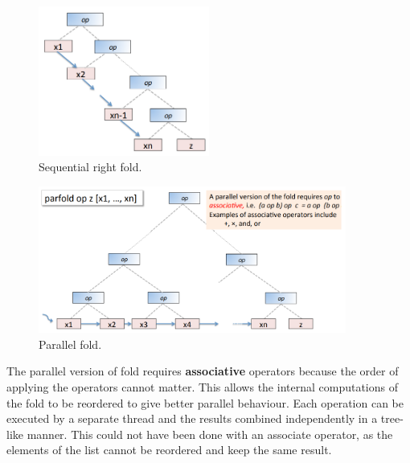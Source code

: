 \documentclass[CS4204-Notes.tex]{subfiles}
\begin{document}
\begin{figure}[H]
\centering
\includegraphics[width=0.5\textwidth, keepaspectratio]{imgs/sequential-fold.png}
\caption{Sequential right fold.}
\end{figure}

\begin{figure}[H]
\centering
\includegraphics[width=0.9\textwidth, keepaspectratio]{imgs/parallel-fold.png}
\caption{Parallel fold.}
\end{figure}
\noindent
The parallel version of fold requires \textbf{associative} operators because the order of applying the operators cannot matter. This allows the internal computations of the fold to be reordered to give better parallel behaviour. Each operation can be executed by a separate thread and the results combined independently in a tree-like manner. This could not have been done with an associate operator, as the elements of the list cannot be reordered and keep the same result. 
\end{document}
